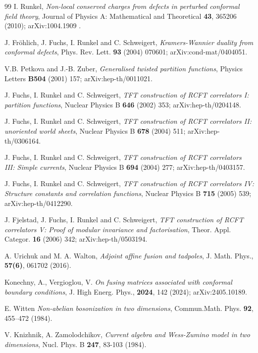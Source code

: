 \documentclass[a4paper,11pt]{article}
\theoremstyle{plain}
\theoremstyle{definition}
\begin{document}
\begin{thebibliography}{99}
 I. Runkel,
\emph{Non-local conserved charges from defects in perturbed conformal field theory},
Journal of Physics A: Mathematical and Theoretical {\bf 43}, 365206 (2010); arXiv:1004.1909 .


 J. Fr\" ohlich, J. Fuchs, I. Runkel and C. Schweigert, 
\emph{Kramers-Wannier duality from conformal defects}, 
Phys. Rev. Lett. {\bf 93} (2004) 070601; arXiv:cond-mat/0404051.

V.B. Petkova and J.-B. Zuber,
\emph{Generalised twisted partition functions},
Physics Letters {\bf B504} (2001) 157; arXiv:hep-th/0011021.

J. Fuchs, I. Runkel and C. Schweigert,
\emph{{TFT} construction of {RCFT} correlators {I}: partition functions},
Nuclear Physics B {\bf 646} (2002) 353; 	arXiv:hep-th/0204148.

J. Fuchs, I. Runkel and C. Schweigert,
\emph{{TFT} construction of {RCFT} correlators {II}: unoriented world sheets},
Nuclear Physics B {\bf 678} (2004) 511; 	arXiv:hep-th/0306164.

J. Fuchs, I. Runkel and C. Schweigert,
\emph{{TFT} construction of {RCFT} correlators {III}: Simple currents},
Nuclear Physics B {\bf 694} (2004) 277; arXiv:hep-th/0403157.

J. Fuchs, I. Runkel and C. Schweigert,
\emph{{TFT} construction of {RCFT} correlators {IV}: Structure constants and correlation functions},
Nuclear Physics B {\bf 715} (2005) 539; 	arXiv:hep-th/0412290.

J. Fjelstad, J. Fuchs, I. Runkel and C. Schweigert,
\emph{{TFT} construction of {RCFT} correlators {V}: Proof of modular invariance and factorisation},
Theor. Appl. Categor. {\bf 16} (2006) 342; 	arXiv:hep-th/0503194.


 A. Urichuk and M. A. Walton, \emph{Adjoint aﬃne fusion and tadpoles}, J.
Math. Phys., {\bf 57(6)}, 061702 (2016).

 Konechny, A., Vergioglou, V. \emph{On fusing matrices associated with conformal boundary  conditions}, J. High Energ. Phys.,  {\bf 2024}, 142 (2024); 	arXiv:2405.10189.





 E. Witten \emph{Non-abelian bosonization in two dimensions},
Commun.Math. Phys. \textbf{92}, 455–472 (1984).

 V. Knizhnik, A. Zamolodchikov, \emph{Current algebra and Wess-Zumino model in two dimensions}, Nucl. Phys. B \textbf{247}, 83-103 (1984).


\end{thebibliography}
\end{document}
